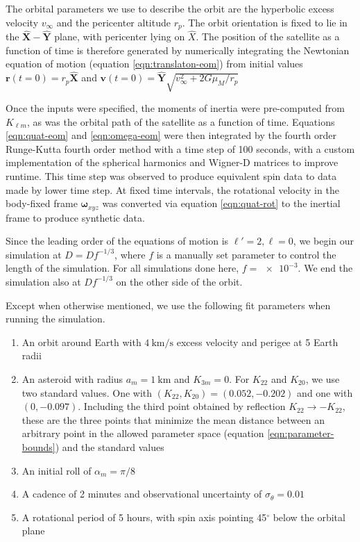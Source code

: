 \documentclass[11pt]{article}
\newcommand{\unit}[1]{\hat{\mathbf{#1}}}
\begin{document}
The orbital parameters we use to describe the orbit are the hyperbolic excess velocity $v_\infty$ and the pericenter altitude $r_p$. The orbit orientation is fixed to lie in the $\unit X-\unit Y$ plane, with pericenter lying on $\hat X$. The position of the satellite as a function of time is therefore generated by numerically integrating the Newtonian equation of motion (equation \ref{eqn:translaton-eom}) from initial values $\bm r(t=0) = r_p \unit X$ and $\bm v(t=0)=\unit Y \sqrt{v_\infty^2 + 2G\mu_M / r_p}$

Once the inputs were specified, the moments of inertia were pre-computed from $K_{\ell m}$, as was the orbital path of the satellite as a function of time. Equations \ref{eqn:quat-eom} and \ref{eqn:omega-eom} were then integrated by the fourth order Runge-Kutta fourth order method with a time step of 100 seconds, with a custom implementation of the spherical harmonics and Wigner-D matrices to improve runtime. This time step was observed to produce equivalent spin data to data made by lower time step. At fixed time intervals, the rotational velocity in the body-fixed frame $\bm\omega_{xyz}$ was converted via equation \ref{eqn:quat-rot} to the inertial frame to produce synthetic data.

Since the leading order of the equations of motion is $\ell' = 2, \ell = 0$, we begin our simulation at $D = D f^{-1/3}$, where $f$ is a manually set parameter to control the length of the simulation. For all simulations done here, $f = \SI{e-3}.$ We end the simulation also at $D f^{-1/3}$ on the other side of the orbit.

Except when otherwise mentioned, we use the following fit parameters when running the simulation.
\begin{enumerate}
\item An orbit around Earth with $\SI{4}{\kilo\meter\per\second}$ excess velocity and perigee at 5 Earth radii
\item An asteroid with radius $a_m = \SI{1}{\kilo\meter}$ and $K_{3m}=0$. For $K_{22}$ and $K_{20}$, we use two standard values. One with $(K_{22}, K_{20}) = (0.052, -0.202)$ and one with $(0, -0.097)$. Including the third point obtained by reflection $K_{22}\rightarrow -K_{22}$, these are the three points that minimize the mean distance between an arbitrary point in the allowed parameter space (equation \ref{eqn:parameter-bounds}) and the standard values
\item An initial roll of $\alpha_m=\pi/8$
\item A cadence of 2 minutes and observational uncertainty of $\sigma_\theta = 0.01$
\item A rotational period of 5 hours, with spin axis pointing 45$^\circ$ below the orbital plane
\end{enumerate}
\end{document}
